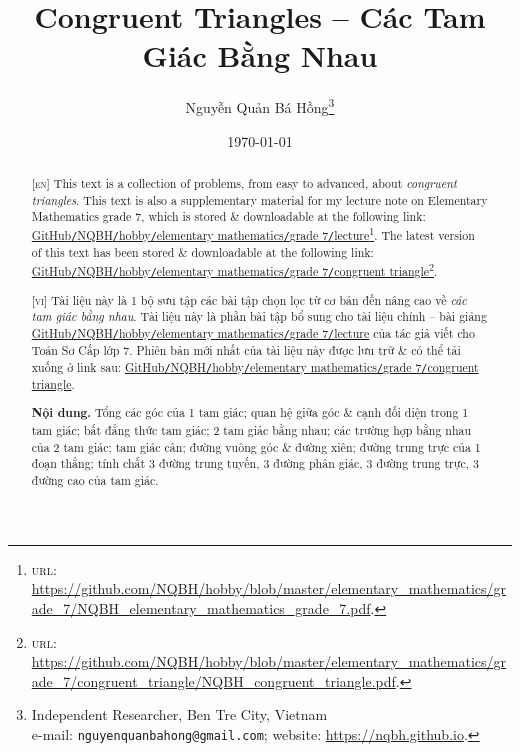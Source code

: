 \documentclass{article}
\title{Congruent Triangles -- Các Tam Giác Bằng Nhau}
\author{Nguyễn Quản Bá Hồng\footnote{Independent Researcher, Ben Tre City, Vietnam\\e-mail: \texttt{nguyenquanbahong@gmail.com}; website: \url{https://nqbh.github.io}.}}
\date{\today}
\begin{document}
\maketitle
\begin{abstract}
	\textsc{[en]} This text is a collection of problems, from easy to advanced, about \textit{congruent triangles}. This text is also a supplementary material for my lecture note on Elementary Mathematics grade 7, which is stored \& downloadable at the following link: \href{https://github.com/NQBH/hobby/blob/master/elementary_mathematics/grade_7/NQBH_elementary_mathematics_grade_7.pdf}{GitHub\texttt{/}NQBH\texttt{/}hobby\texttt{/}elementary mathematics\texttt{/}grade 7\texttt{/}lecture}\footnote{\textsc{url}: \url{https://github.com/NQBH/hobby/blob/master/elementary_mathematics/grade_7/NQBH_elementary_mathematics_grade_7.pdf}.}. The latest version of this text has been stored \& downloadable at the following link: \href{https://github.com/NQBH/hobby/blob/master/elementary_mathematics/grade_7/congruent_triangle/NQBH_congruent_triangle.pdf}{GitHub\texttt{/}NQBH\texttt{/}hobby\texttt{/}elementary mathematics\texttt{/}grade 7\texttt{/}congruent triangle}\footnote{\textsc{url}: \url{https://github.com/NQBH/hobby/blob/master/elementary_mathematics/grade_7/congruent_triangle/NQBH_congruent_triangle.pdf}.}.
	\vspace{2mm}
	
	\textsc{[vi]} Tài liệu này là 1 bộ sưu tập các bài tập chọn lọc từ cơ bản đến nâng cao về \textit{các tam giác bằng nhau}. Tài liệu này là phần bài tập bổ sung cho tài liệu chính -- bài giảng \href{https://github.com/NQBH/hobby/blob/master/elementary_mathematics/grade_7/NQBH_elementary_mathematics_grade_7.pdf}{GitHub\texttt{/}NQBH\texttt{/}hobby\texttt{/}elementary mathematics\texttt{/}grade 7\texttt{/}lecture} của tác giả viết cho Toán Sơ Cấp lớp 7. Phiên bản mới nhất của tài liệu này được lưu trữ \& có thể tải xuống ở link sau: \href{https://github.com/NQBH/hobby/blob/master/elementary_mathematics/grade_7/congruent_triangle/NQBH_congruent_triangle.pdf}{GitHub\texttt{/}NQBH\texttt{/}hobby\texttt{/}elementary mathematics\texttt{/}grade 7\texttt{/}congruent triangle}.
	
	\textsf{\textbf{Nội dung.} Tổng các góc của 1 tam giác; quan hệ giữa góc \& cạnh đối diện trong 1 tam giác; bất đẳng thức tam giác; 2 tam giác bằng nhau; các trường hợp bằng nhau của 2 tam giác; tam giác cân; đường vuông góc \& đường xiên; đường trung trực của 1 đoạn thẳng; tính chất 3 đường trung tuyến, 3 đường phân giác, 3 đường trung trực, 3 đường cao của tam giác.}
\end{abstract}
\setcounter{secnumdepth}{4}
\setcounter{tocdepth}{3}
\tableofcontents
\end{document}
